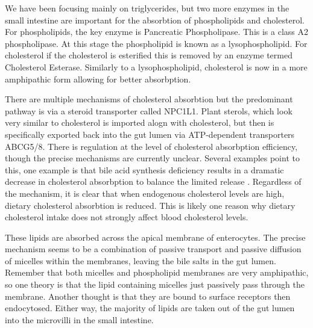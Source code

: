 \documentclass{tufte-handout}
\begin{document}
  We have been focusing mainly on triglycerides, but two more enzymes in the small intestine are important for the absorbtion of phospholipids and cholesterol.  For phospholipids, the key enzyme is Pancreatic Phospholipase.  This is a class A2 phospholipase.  At this stage the phospholipid is known as a lysophospholipid.  For cholesterol if the cholesterol is esterified this is removed by an enzyme termed Cholesterol Esterase.  Similarly to a lysophospholipid, cholesterol is now in a more amphipathic form allowing for better absorbption.


  There are multiple mechanisms of cholesterol absorbtion but the predominant pathway is via a steroid transporter called NPC1L1\citep{Altmann2004,Iqbal2005}.  Plant sterols, which look very similar to cholesterol is imported alogn with cholesterol, but then is specifically exported back into the gut lumen via ATP-dependent transporters ABCG5/8.  There is regulation at the level of cholesterol absorbption efficiency, though the precise mechanisms are currently unclear.  Several examples point to this, one example is that bile acid synthesis deficiency results in a dramatic decrease in cholesterol absorbption to balance the limited release \citep{Repa2000,Wang2007d}.  Regardless of the mechanism, it is clear that when endogenous cholesterol levels are high, dietary cholesterol absorbtion is reduced.  This is likely one reason why dietary cholesterol intake does not strongly affect blood cholesterol levels.

  These lipids are absorbed across the apical membrane of enterocytes.  The precise mechanism seems to be a combination of passive transport and passive diffusion of micelles within the membranes, leaving the bile salts in the gut lumen.  Remember that both micelles and phospholipid membranes are very amphipathic, so one theory is that the lipid containing micelles just passively pass through the membrane.  Another thought is that they are bound to surface receptors then endocytosed.  Either way, the majority of lipids are taken out of the gut lumen into the microvilli in the small intestine.
\end{document}
